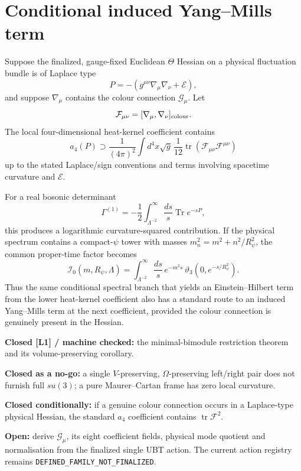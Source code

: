 \documentclass[11pt,a4paper]{article}
\begin{document}
\section{Conditional induced Yang--Mills term}

Suppose the finalized, gauge-fixed Euclidean $\Theta$ Hessian on a physical
fluctuation bundle is of Laplace type
\[
 P=-\left(g^{\mu\nu}\nabla_\mu\nabla_\nu+\mathcal E\right),
\]
and suppose $\nabla_\mu$ contains the colour connection $\mathcal G_\mu$.
Let
\[
 \mathcal F_{\mu\nu}=[\nabla_\mu,\nabla_\nu]_{\rm colour}.
\]
The local four-dimensional heat-kernel coefficient contains
\[
 \boxed{
 a_4(P)\supset
 \frac{1}{(4\pi)^2}\int d^4x\sqrt g\,
 \frac1{12}\operatorname{tr}
 \left(\mathcal F_{\mu\nu}\mathcal F^{\mu\nu}\right)
 }
\]
up to the stated Laplace/sign conventions and terms involving spacetime
curvature and $\mathcal E$.

For a real bosonic determinant
\[
 \Gamma^{(1)}
 =-\frac12\int_{\Lambda^{-2}}^\infty\frac{ds}{s}
 \operatorname{Tr}e^{-sP},
\]
this produces a logarithmic curvature-squared contribution.  If the physical
spectrum contains a compact-$\psi$ tower with masses
$m_n^2=m^2+n^2/R_\psi^2$, the common proper-time factor becomes
\[
 \mathcal I_0(m,R_\psi,\Lambda)
 =\int_{\Lambda^{-2}}^\infty\frac{ds}{s}\,
 e^{-m^2s}\,
 \vartheta_3(0,e^{-s/R_\psi^2}).
\]
Thus the same conditional spectral branch that yields an Einstein--Hilbert
term from the lower heat-kernel coefficient also has a standard route to an
induced Yang--Mills term at the next coefficient, provided the colour
connection is genuinely present in the Hessian.

\begin{tcolorbox}[colback=yellow!8!white,colframe=orange!70!black,title=Exact status]
\textbf{Closed [L1] / machine checked:}
the minimal-bimodule restriction theorem and its volume-preserving corollary.

\medskip
\textbf{Closed as a no-go:}
a single $V$-preserving, $\Omega$-preserving left/right pair does not furnish
full $su(3)$; a pure Maurer--Cartan frame has zero local curvature.

\medskip
\textbf{Closed conditionally:}
if a genuine colour connection occurs in a Laplace-type physical Hessian, the
standard $a_4$ coefficient contains $\operatorname{tr}\mathcal F^2$.

\medskip
\textbf{Open:}
derive $\mathcal G_\mu$, its eight coefficient fields, physical mode quotient
and normalisation from the finalized single UBT action.  The current action
registry remains \texttt{DEFINED\_FAMILY\_NOT\_FINALIZED}.
\end{tcolorbox}
\end{document}
